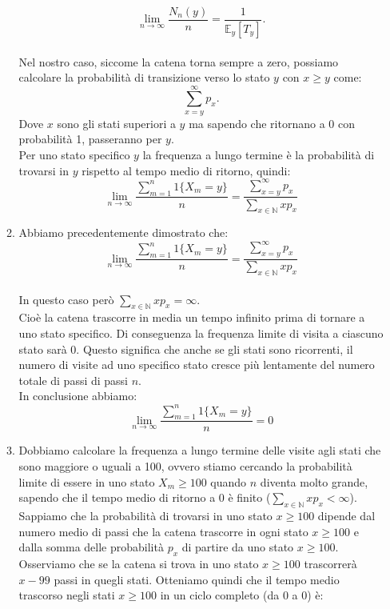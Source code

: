 \documentclass[a4paper,12pt]{article}
\begin{document}
\begin{itemize}
\begin{enumerate}[label=\alph*)]
			\[
			\lim_{n \to \infty} \frac{N_n(y)}{n} = \frac{1}{\mathbb{E}_y[T_y]}.
			\]\\
			Nel nostro caso, siccome la catena torna sempre a zero, possiamo calcolare la probabilità di transizione verso lo stato $y$ con $x\geq y$ come:\\
			\[
			\sum_{x = y}^{\infty} p_x.
			\]
			Dove $x$ sono gli stati superiori a $y$ ma sapendo che ritornano a 0 con probabilità 1, passeranno per $y$.\\
			Per uno stato specifico $y$ la frequenza a lungo termine è la probabilità di trovarsi in $y$ rispetto al tempo medio di ritorno, quindi:\\
			\[
			\lim_{n \to \infty} \frac{\sum_{m=1}^n 1\{X_m = y\}}{n} = \frac{\sum_{x = y}^{\infty} p_x}{\sum_{x \in \mathbb{N}} x p_x}
			\]
			\item Abbiamo precedentemente dimostrato che:\\
			\[
			\lim_{n \to \infty} \frac{\sum_{m=1}^n 1\{X_m = y\}}{n} = \frac{\sum_{x = y}^{\infty} p_x}{\sum_{x \in \mathbb{N}} x p_x}
			\]\\
			In questo caso però \( \sum_{x \in \mathbb{N}} x p_x = \infty \).\\
			Cioè la catena trascorre in media un tempo infinito prima di tornare a uno stato specifico. Di conseguenza la frequenza limite di visita a ciascuno stato sarà 0. Questo significa che anche se gli stati sono ricorrenti, il numero di visite ad uno specifico stato cresce più lentamente del numero totale di passi di passi $n$. \\
			In conclusione abbiamo:\\
			\[
			\lim_{n \to \infty} \frac{\sum_{m=1}^n 1\{X_m = y\}}{n} = 0
			\]
			\item Dobbiamo calcolare la frequenza a lungo termine delle visite agli stati che sono maggiore o uguali a 100, ovvero stiamo cercando la probabilità limite di essere in uno stato $X_m \geq 100$
			quando $n$ diventa molto grande, sapendo che il tempo medio di ritorno a 0 è finito (\( \sum_{x \in \mathbb{N}} x p_x < \infty \)).\\
			Sappiamo che la probabilità di trovarsi in uno stato $x \geq 100$ dipende dal numero medio di passi che la catena trascorre in ogni stato $x \geq 100$ e dalla somma delle probabilità $p_x$ di partire da uno stato $x \geq 100$. Osserviamo che se la catena si trova in uno stato $x \geq 100$ trascorrerà $x-99$ passi in quegli stati. Otteniamo quindi che il tempo medio trascorso negli stati $x \geq 100$ in un ciclo completo (da 0 a 0) è:\\

\end{enumerate}
\end{itemize}
\end{document}
